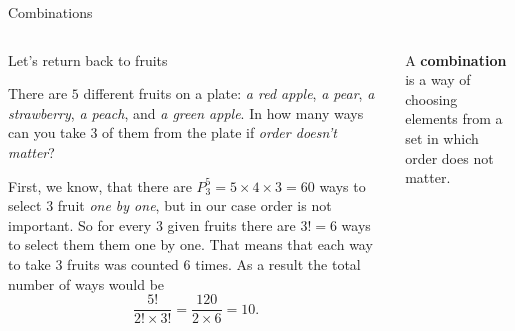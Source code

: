 \documentclass[9pt,aspectratio=169]{beamer}
\begin{document}
\begin{frame}{Combinations}
  \begin{columns}[T]
    \begin{column}{0.5\textwidth}
      Let’s return back to fruits

      \begin{problem}
        There are $5$ different fruits on a plate: \emph{a red apple}, \emph{a pear}, \emph{a strawberry}, \emph{a peach}, and \emph{a green apple}. In how many ways can you take $3$ of them from the plate if \emph{order doesn’t matter}?
      \end{problem}

      \begin{nscenter}
      \end{nscenter}

      First, we know, that there are $P_3^5 = 5 \times 4 \times 3 = 60$ ways to select $3$ fruit \emph{one by one}, but in our case order is not important. So for every $3$ given fruits there are $3! = 6$ ways to select them them one by one. That means that each way to take $3$ fruits was counted $6$ times. As a result the total number of ways would be 
      \[
        \frac{5!}{2! \times 3!} = \frac{120}{2 \times 6} = 10.
      \]
    \end{column}
    \begin{column}{0.5\textwidth}
      \begin{definition}
        A \textbf{combination} is a way of choosing elements from a set in which order does not matter.
      \end{definition}


\end{column}
\end{columns}
\end{frame}
\end{document}
